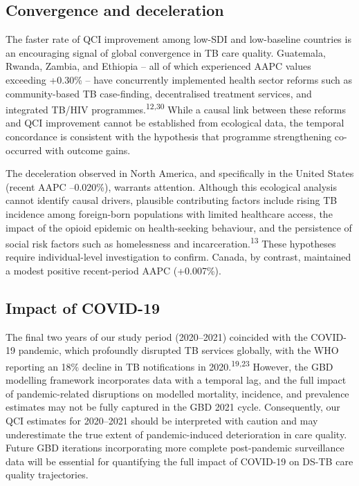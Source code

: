 \documentclass[12pt]{article}
\begin{document}
\subsection{Convergence and deceleration}

The faster rate of QCI improvement among low-SDI and low-baseline countries is an encouraging signal of global convergence in TB care quality. Guatemala, Rwanda, Zambia, and Ethiopia -- all of which experienced AAPC values exceeding +0.30\% -- have concurrently implemented health sector reforms such as community-based TB case-finding, decentralised treatment services, and integrated TB/HIV programmes.\textsuperscript{12,30} While a causal link between these reforms and QCI improvement cannot be established from ecological data, the temporal concordance is consistent with the hypothesis that programme strengthening co-occurred with outcome gains.

The deceleration observed in North America, and specifically in the United States (recent AAPC --0.020\%), warrants attention. Although this ecological analysis cannot identify causal drivers, plausible contributing factors include rising TB incidence among foreign-born populations with limited healthcare access, the impact of the opioid epidemic on health-seeking behaviour, and the persistence of social risk factors such as homelessness and incarceration.\textsuperscript{13} These hypotheses require individual-level investigation to confirm. Canada, by contrast, maintained a modest positive recent-period AAPC (+0.007\%).

\subsection{Impact of COVID-19}

The final two years of our study period (2020--2021) coincided with the COVID-19 pandemic, which profoundly disrupted TB services globally, with the WHO reporting an 18\% decline in TB notifications in 2020.\textsuperscript{19,23} However, the GBD modelling framework incorporates data with a temporal lag, and the full impact of pandemic-related disruptions on modelled mortality, incidence, and prevalence estimates may not be fully captured in the GBD 2021 cycle. Consequently, our QCI estimates for 2020--2021 should be interpreted with caution and may underestimate the true extent of pandemic-induced deterioration in care quality. Future GBD iterations incorporating more complete post-pandemic surveillance data will be essential for quantifying the full impact of COVID-19 on DS-TB care quality trajectories.
\end{document}
